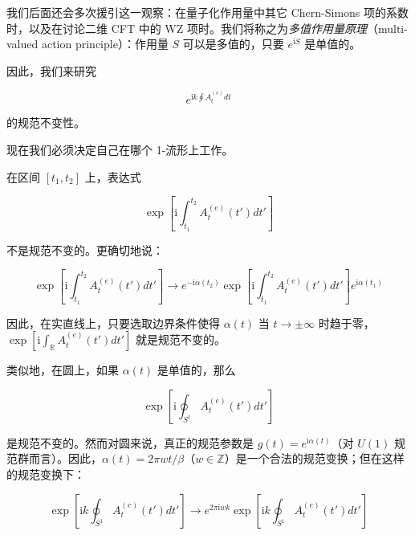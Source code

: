 \begin{center}
\end{center}

我们后面还会多次援引这一观察：在量子化作用量中其它 Chern-Simons 项的系数时，以及在讨论二维 CFT 中的 WZ 项时。我们将称之为\emph{多值作用量原理}（multi-valued action principle）：作用量 $S$ 可以是多值的，只要 $e^{\mathrm{i}S}$ 是单值的。

因此，我们来研究

\begin{equation}
  e^{\mathrm{i}k\oint A_t^{(e)}dt}
  \tag{2.32}
  \label{eq:2.32}
\end{equation}

的规范不变性。

现在我们必须决定自己在哪个 1-流形上工作。

在区间 $[t_1,t_2]$ 上，表达式

\begin{equation}
  \exp\left[\mathrm{i}\int_{t_1}^{t_2}A_t^{(e)}(t')dt'\right]
  \tag{2.33}
  \label{eq:2.33}
\end{equation}

不是规范不变的。更确切地说：

\begin{equation}
  \exp\left[\mathrm{i}\int_{t_1}^{t_2}A_t^{(e)}(t')dt'\right]\to e^{-\mathrm{i}\alpha(t_2)}\exp\left[\mathrm{i}\int_{t_1}^{t_2}A_t^{(e)}(t')dt'\right]e^{\mathrm{i}\alpha(t_1)}
  \tag{2.34}
  \label{eq:2.34}
\end{equation}

因此，在实直线上，只要选取边界条件使得 $\alpha(t)$ 当 $t\to\pm\infty$ 时趋于零，$\exp\left[\mathrm{i}\int_{\mathbb{R}}A_t^{(e)}(t')dt'\right]$ 就是规范不变的。

类似地，在圆上，如果 $\alpha(t)$ 是单值的，那么

\begin{equation}
  \exp\left[\mathrm{i}\oint_{S^{1}}A_t^{(e)}(t')dt'\right]
  \tag{2.35}
  \label{eq:2.35}
\end{equation}

是规范不变的。然而对圆来说，真正的规范参数是 $g(t)=e^{\mathrm{i}\alpha(t)}$（对 $U(1)$ 规范群而言）。因此，$\alpha(t)=2\pi wt/\beta$（$w\in\mathbb{Z}$）是一个合法的规范变换；但在这样的规范变换下：

\begin{equation}
  \exp\left[\mathrm{i}k\oint_{S^{1}}A_t^{(e)}(t')dt'\right]\to e^{2\pi\mathrm{i}wk}\exp\left[\mathrm{i}k\oint_{S^{1}}A_t^{(e)}(t')dt'\right]
  \tag{2.36}
  \label{eq:2.36}
\end{equation}


